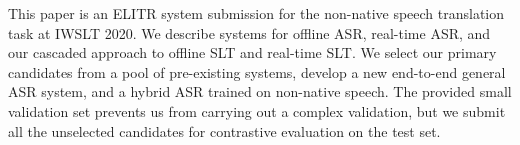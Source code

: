This paper is an ELITR system submission for the non-native speech translation task at IWSLT 2020. We describe systems for offline ASR, real-time ASR, and our cascaded approach to offline SLT and real-time SLT. We select our primary candidates from a pool of pre-existing systems, develop a new end-to-end general ASR system, and a hybrid ASR trained on non-native speech. The provided small validation set prevents us from carrying out a complex validation, but we submit all the unselected candidates for contrastive evaluation on the test set.
